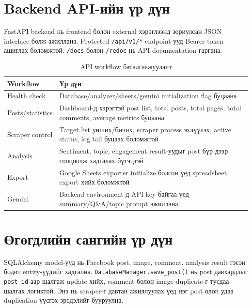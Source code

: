 \documentclass[
12pt,
oneside,
english,
onehalfspacing,
nolistspacing,
headsepline,
]{MUST-Thesis}
\begin{document}
\section{Backend API-ийн үр дүн}

FastAPI backend нь frontend болон external хэрэглээнд зориулсан JSON interface болж ажиллана. Protected \texttt{/api/v1/*} endpoint-ууд Bearer token ашиглах боломжтой. \texttt{/docs} болон \texttt{/redoc} нь API documentation гаргана.

\begin{table}[H]
\centering
\caption{API workflow баталгаажуулалт}
\small
\renewcommand{\arraystretch}{1.25}
\begin{adjustbox}{max width=\textwidth}
\begin{tabular}{|L{3.6cm}|L{9.8cm}|}
\hline
{}\textbf{Workflow} & \textbf{Үр дүн} \\
\hline
Health check & Database/analyzer/sheets/gemini initialization flag буцаана \\
\hline
Posts/statistics & Dashboard-д хэрэгтэй post list, total posts, total pages, total comments, average metrics буцаана \\
\hline
Scraper control & Target list унших/бичих, scraper process эхлүүлэх, active status, log tail буцаах боломжтой \\
\hline
Analysis & Sentiment, topic, engagement result-уудыг post бүр дээр тооцоолж хадгалах бүтэцтэй \\
\hline
Export & Google Sheets exporter initialize болсон үед spreadsheet export хийх боломжтой \\
\hline
Gemini & Backend environment-д API key байгаа үед summary/Q\&A/topic prompt ажиллана \\
\hline
\end{tabular}
\end{adjustbox}
\normalsize
\end{table}

\section{Өгөгдлийн сангийн үр дүн}

SQLAlchemy model-ууд нь Facebook post, image, comment, analysis result гэсэн бодит entity-үүдийг хадгална. \texttt{DatabaseManager.save\_post()} нь post давхардлыг \texttt{post\_id}-аар шалгаж update хийх, comment болон image duplicate-г тусдаа шалгах логиктой. Энэ нь scraper-г давтан ажиллуулах үед нэг post олон удаа duplication үүсгэх эрсдэлийг бууруулна.
\end{document}
